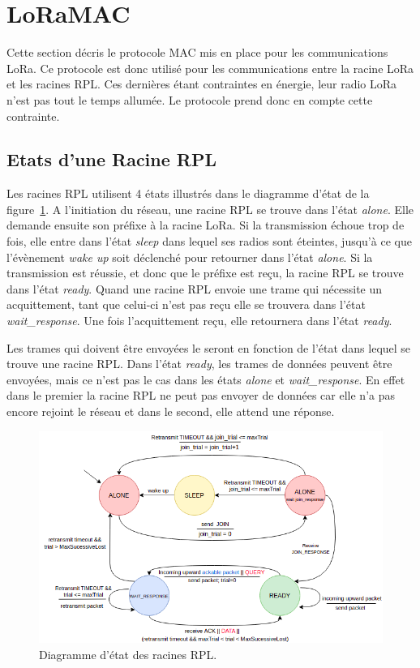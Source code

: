 \section{LoRaMAC}\label{sec:archi-loramac:proto}
\renewcommand{\rightmark}{LoRaMac}

    Cette section décris le protocole MAC mis en place pour les communications LoRa. Ce protocole est donc utilisé pour les communications entre la racine LoRa et les racines RPL. Ces dernières étant contraintes en énergie, leur radio LoRa n'est pas tout le temps allumée. Le protocole prend donc en compte cette contrainte.

\subsection*{Etats d'une Racine RPL}
    Les racines RPL utilisent 4 états illustrés dans le diagramme d'état de la figure~\ref{fig:archi-state}. A l'initiation du réseau, une racine RPL se trouve dans l'état \textit{alone}. Elle demande ensuite son préfixe à la racine LoRa. Si la transmission échoue trop de fois, elle entre dans l'état \textit{sleep} dans lequel ses radios sont éteintes, jusqu'à ce que l'évènement \textit{wake up} soit déclenché pour retourner dans l'état \textit{alone}. Si la transmission est réussie, et donc que le préfixe est reçu, la racine RPL se trouve dans l'état \textit{ready}. Quand une racine RPL envoie une trame qui nécessite un acquittement, tant que celui-ci n'est pas reçu elle se trouvera dans l'état \textit{wait\_response}. Une fois l'acquittement reçu, elle retournera dans l'état \textit{ready}.
    
    Les trames qui doivent être envoyées le seront en fonction de l'état dans lequel se trouve une racine RPL. Dans l'état \textit{ready}, les trames de données peuvent être envoyées, mais ce n'est pas le cas dans les états \textit{alone} et \textit{wait\_response}. En effet dans le premier la racine RPL ne peut pas envoyer de données car elle n'a pas encore rejoint le réseau et dans le second, elle attend une réponse.
    \begin{figure}[H]
        \centering
        \includegraphics[scale=0.5]{res/pictures/loramac-state.drawio.png}
        \caption{Diagramme d'état des racines RPL.}
        \label{fig:archi-state}
    \end{figure}

